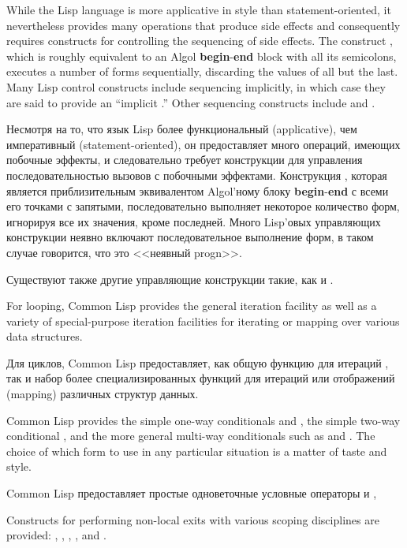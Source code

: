 While the Lisp language
is more applicative in style than statement-oriented, it
nevertheless provides many operations that produce side effects and
consequently requires constructs for controlling the sequencing of
side effects.  The construct
, which is roughly equivalent to an Algol \textbf{begin}-\textbf{end}
block with all its semicolons, executes a number of forms sequentially,
discarding the values of all but the last.
Many Lisp control constructs
include sequencing implicitly, in which case they are said to
provide an ``implicit .''
Other sequencing constructs include  and .

Несмотря на то, что язык Lisp более функциональный (applicative), чем императивный
(statement-oriented), он предоставляет много операций, имеющих побочные эффекты,
и следовательно требует конструкции для управления последовательностью вызовов с
побочными эффектами. Конструкция , которая является приблизительным
эквивалентом Algol'ному блоку \textbf{begin}-\textbf{end} с всеми его точками с
запятыми, последовательно выполняет некоторое количество форм, игнорируя все их
значения, кроме последней.
Много Lisp'овых управляющих конструкции неявно включают последовательное
выполнение форм, в таком случае говорится, что это <<неявный progn>>.


Существуют также другие управляющие конструкции такие, как  и
.

For looping, Common Lisp provides the general iteration facility
 as well as a variety
of special-purpose iteration facilities for iterating or mapping
over various data structures.

Для циклов, Common Lisp предоставляет, как общую функцию для итераций ,
так и набор более специализированных функций для итераций или отображений
(mapping) различных структур данных.

Common Lisp provides the simple one-way conditionals  and ,
the simple two-way conditional , and the more general multi-way
conditionals such as  and .  The choice of which form
to use in any particular situation is a matter of taste and
style.

Common Lisp предоставляет простые одноветочные условные операторы  и
,

Constructs for performing non-local exits with various scoping
disciplines are provided: , ,
,
, and .

